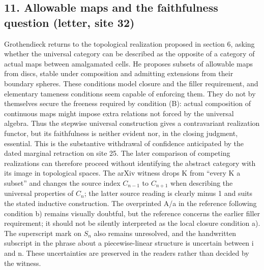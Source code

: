 \documentclass[10pt,oneside]{book}
\begin{document}
\subsection*{11. Allowable maps and the faithfulness question (letter, site 32)}
Grothendieck returns to the topological realization proposed in section 6, asking whether the universal category can be described as the opposite of a category of actual maps between amalgamated cells. He proposes subsets of allowable maps from discs, stable under composition and admitting extensions from their boundary spheres. These conditions model closure and the filler requirement, and elementary tameness conditions seem capable of enforcing them. They do not by themselves secure the freeness required by condition (B): actual composition of continuous maps might impose extra relations not forced by the universal algebra. Thus the stepwise universal construction gives a contravariant realization functor, but its faithfulness is neither evident nor, in the closing judgment, essential. This is the substantive withdrawal of confidence anticipated by the dated marginal retraction on site 25. The later comparison of competing realizations can therefore proceed without identifying the abstract category with its image in topological spaces. The arXiv witness drops K from ``every K a subset'' and changes the source index $C_{n-1}$ to $C_{n+1}$ when describing the universal properties of $C_n$; the latter source reading is clearly minus 1 and suits the stated inductive construction. The overprinted A/a in the reference following condition b) remains visually doubtful, but the reference concerns the earlier filler requirement; it should not be silently interpreted as the local closure condition a). The superscript mark on $S_n$ also remains unresolved, and the handwritten subscript in the phrase about a piecewise-linear structure is uncertain between i and n. These uncertainties are preserved in the readers rather than decided by the witness.
\end{document}
